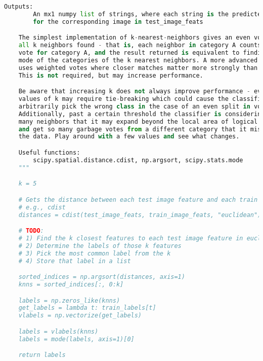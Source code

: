 \begin{lstlisting}[caption={student.py}, label={l:code-example}, captionpos=t, language=python]
    Outputs:
        An mx1 numpy list of strings, where each string is the predicted label
        for the corresponding image in test_image_feats

    The simplest implementation of k-nearest-neighbors gives an even vote to
    all k neighbors found - that is, each neighbor in category A counts as one
    vote for category A, and the result returned is equivalent to finding the
    mode of the categories of the k nearest neighbors. A more advanced version
    uses weighted votes where closer matches matter more strongly than far ones.
    This is not required, but may increase performance.

    Be aware that increasing k does not always improve performance - even
    values of k may require tie-breaking which could cause the classifier to
    arbitrarily pick the wrong class in the case of an even split in votes.
    Additionally, past a certain threshold the classifier is considering so
    many neighbors that it may expand beyond the local area of logical matches
    and get so many garbage votes from a different category that it mislabels
    the data. Play around with a few values and see what changes.

    Useful functions:
        scipy.spatial.distance.cdist, np.argsort, scipy.stats.mode
    """

    k = 5

    # Gets the distance between each test image feature and each train image feature
    # e.g., cdist
    distances = cdist(test_image_feats, train_image_feats, "euclidean")

    # TODO:
    # 1) Find the k closest features to each test image feature in euclidean space
    # 2) Determine the labels of those k features
    # 3) Pick the most common label from the k
    # 4) Store that label in a list

    sorted_indices = np.argsort(distances, axis=1)
    knns = sorted_indices[:, 0:k]

    labels = np.zeros_like(knns)
    get_labels = lambda t: train_labels[t]
    vlabels = np.vectorize(get_labels)

    labels = vlabels(knns)
    labels = mode(labels, axis=1)[0]

    return labels

\end{lstlisting}
